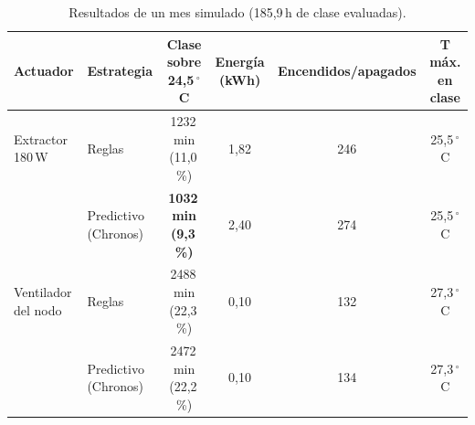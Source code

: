 \documentclass[10pt,a4paper]{article}
\begin{document}
\begin{table}[H]
\centering\scriptsize
\caption{Resultados de un mes simulado (185,9\,h de clase evaluadas).}
\label{tab:sim}
\begin{tabular}{llcccc}
\toprule
\textbf{Actuador} & \textbf{Estrategia} & \textbf{Clase sobre 24,5\,$^\circ$C} & \textbf{Energía (kWh)} & \textbf{Encendidos/apagados} & \textbf{T máx. en clase} \\
\midrule
Extractor 180\,W & Reglas & 1232\,min (11,0\,\%) & 1,82 & 246 & 25,5\,$^\circ$C \\
 & Predictivo (Chronos) & \textbf{1032\,min (9,3\,\%)} & 2,40 & 274 & 25,5\,$^\circ$C \\
\midrule
Ventilador del nodo & Reglas & 2488\,min (22,3\,\%) & 0,10 & 132 & 27,3\,$^\circ$C \\
 & Predictivo (Chronos) & 2472\,min (22,2\,\%) & 0,10 & 134 & 27,3\,$^\circ$C \\
\bottomrule
\end{tabular}
\end{table}
\end{document}
